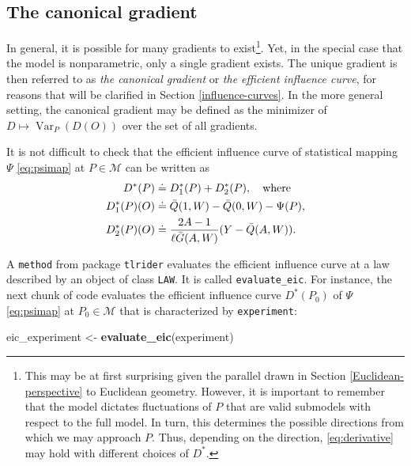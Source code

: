 \documentclass[11pt,openright,twoside]{book}
\newenvironment{Shaded}{\begin{snugshade}}{\end{snugshade}}
\newcommand{\KeywordTok}[1]{\textcolor[rgb]{0.13,0.29,0.53}{\textbf{#1}}}
\newcommand{\NormalTok}[1]{#1}
\newcommand{\StringTok}[1]{\textcolor[rgb]{0.31,0.60,0.02}{#1}}
\DeclareMathOperator{\Var}{Var}
\newcommand{\defq}{\doteq}
\newcommand{\calM}{\mathcal{M}}
\newcommand{\Gbar}{\bar{G}}
\newcommand{\Qbar}{\bar{Q}}
\theoremstyle{definition}
\theoremstyle{definition}
\theoremstyle{definition}
\theoremstyle{remark}
\begin{document}
\hypertarget{canonical-gradient}{%
\subsection{The canonical gradient}\label{canonical-gradient}}

In general, it is possible for many gradients to exist\footnote{This may be at first
  surprising given the parallel drawn in Section \ref{Euclidean-perspective} to
  Euclidean geometry. However, it is important to remember that the model
  dictates fluctuations of \(P\) that are valid submodels with respect to the full
  model. In turn, this determines the possible directions from which we may
  approach \(P\). Thus, depending on the direction, \eqref{eq:derivative} may hold
  with different choices of \(D^*\).}. Yet, in the special case that the model is
nonparametric, only a single gradient exists. The unique gradient is then
referred to as \emph{the canonical gradient} or \emph{the efficient influence curve},
for reasons that will be clarified in Section \ref{influence-curves}. In the
more general setting, the canonical gradient may be defined as the minimizer
of \(D\mapsto \Var_{P} (D(O))\) over the set of all gradients.

It is not difficult to check that the efficient influence curve of statistical
mapping \(\Psi\) \eqref{eq:psimap} at \(P \in \calM\) can be written as
\begin{align}  D^{*}(P)  &  \defq  D_{1}^{*}   (P)  +  D_{2}^{*}  (P),  \quad
\text{where} \label{eq:eif}\\  D_{1}^{*}(P) (O) &\defq \Qbar(1,W)  - \Qbar(0,W) -
\Psi(P),  \notag\\ D_{2}^{*}(P)  (O)  &\defq \frac{2A-1}{\ell\Gbar(A,W)}(Y  -
\Qbar(A,W)).\notag \end{align}

A \texttt{method} from package \texttt{tlrider} evaluates the efficient influence curve at a
law described by an object of class \texttt{LAW}. It is called \texttt{evaluate\_eic}. For
instance, the next chunk of code evaluates the efficient influence curve
\(D^{*}(P_{0})\) of \(\Psi\) \eqref{eq:psimap} at \(P_{0} \in \calM\) that is
characterized by \texttt{experiment}:

\begin{Shaded}
\begin{Highlighting}[]
\NormalTok{eic_experiment <-}\StringTok{ }\KeywordTok{evaluate_eic}\NormalTok{(experiment)}
\end{Highlighting}
\end{Shaded}
\end{document}
